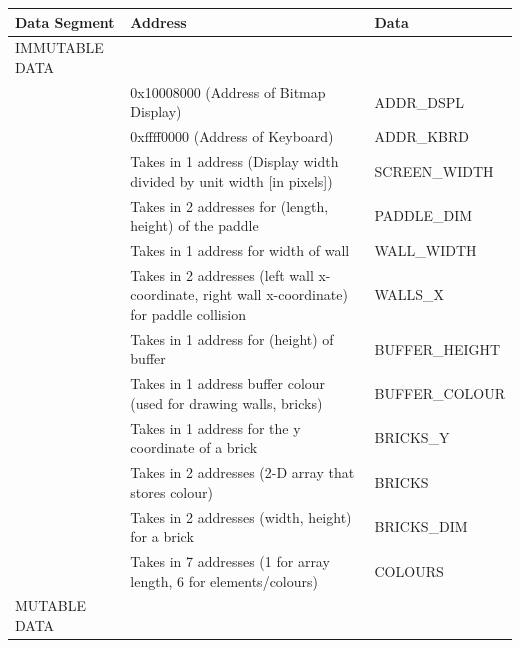 \documentclass{article}
\begin{document}
\begin{enumerate}
\begin{table}[]
\begin{tabular}{|l|l|l|}
\hline
Data Segment     & Address                                                           & Data           \\ \hline
IMMUTABLE DATA   &                                                                   &                \\ \hline
                 & 0x10008000 (Address of Bitmap Display)                            & ADDR\_DSPL    \\ \hline
                 & 0xffff0000 (Address of Keyboard)                                  & ADDR\_KBRD     \\ \hline
                 & Takes in 1 address (Display width divided by unit width [in pixels])           & SCREEN\_WIDTH  \\ \hline
                 & Takes in 2 addresses for (length, height) of the paddle                                           & PADDLE\_DIM    \\ \hline
                 & Takes in 1 address for width of wall                                           & WALL\_WIDTH    \\ \hline
                 & Takes in 2 addresses (left wall x-coordinate, right wall x-coordinate) for paddle collision                                 & WALLS\_X     \\ \hline
                                  & Takes in 1 address for (height) of buffer                                                           & BUFFER\_HEIGHT \\ \hline
                 & Takes in 1 address buffer colour (used for drawing walls, bricks)              & BUFFER\_COLOUR \\ \hline
                                  & Takes in 1 address for the y coordinate of a brick                & BRICKS\_Y      \\ \hline
                 & Takes in 2 addresses (2-D array that stores colour)               & BRICKS         \\ \hline
                 & Takes in 2 addresses (width, height) for a brick               & BRICKS\_DIM         \\ \hline
                 & Takes in 7 addresses (1 for array length, 6 for elements/colours) & COLOURS        \\ \hline
MUTABLE DATA     &                                                                   &                \\ \hline

\end{tabular}
\end{table}
\end{enumerate}
\end{document}
